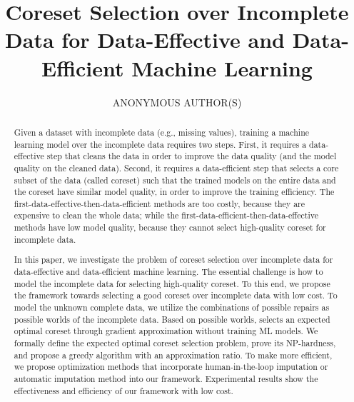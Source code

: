 \documentclass[acmsmall]{acmart}
\begin{document}
\title{Coreset Selection over Incomplete Data for Data-Effective and Data-Efficient Machine Learning}

\author{ANONYMOUS AUTHOR(S)}
\authorsaddresses{}


\begin{abstract}
Given a dataset with incomplete data (e.g., missing values), training a machine learning model over the incomplete data requires two steps. First,  it requires a data-effective step that cleans the data in order to improve the data quality (and the model quality on the cleaned data). Second, it requires a data-efficient step that selects a core subset of the data (called coreset) such that the trained models on the entire data and the coreset have similar model quality, in order to improve the training efficiency. The first-data-effective-then-data-efficient methods are too costly, because they are expensive to clean the whole data; while the first-data-efficient-then-data-effective methods have low model quality, because they cannot select high-quality coreset for incomplete data.
	
In this paper, we investigate the problem of coreset selection over incomplete data for data-effective and data-efficient machine learning. The essential challenge is how to model the incomplete data for selecting high-quality coreset.  To this end, we propose the \ours framework towards selecting a good coreset over incomplete data with low cost. To model the unknown complete data, we utilize the combinations of possible repairs as possible worlds of the incomplete data. 	Based on possible worlds, \ours  selects an expected optimal coreset through gradient approximation without training ML models. We formally define the expected optimal coreset selection problem, prove its NP-hardness, and propose a greedy algorithm with an approximation ratio. To make \ours more efficient, we  propose optimization methods that incorporate human-in-the-loop imputation or automatic imputation method into our framework.  
 Experimental results show the effectiveness and efficiency of our framework with low cost.
\end{abstract}
\end{document}
